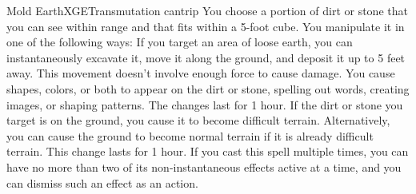 \begin{spell}{Mold Earth}{XGE}{Transmutation cantrip}
{
}
You choose a portion of dirt or stone that you can see
within range and that fits within a 5-foot cube. You
manipulate it in one of the following ways: If you target
an area of loose earth, you can instantaneously excavate
it, move it along the ground, and deposit it up to 5 feet
away. This movement doesn't involve enough force to cause
damage. You cause shapes, colors, or both to appear on the
dirt or stone, spelling out words, creating images, or
shaping patterns. The changes last for 1 hour. If the dirt
or stone you target is on the ground, you cause it to
become difficult terrain. Alternatively, you can cause the
ground to become normal terrain if it is already difficult
terrain. This change lasts for 1 hour. If you cast this
spell multiple times, you can have no more than two of its
non-instantaneous effects active at a time, and you can
dismiss such an effect as an action.
\end{spell}
